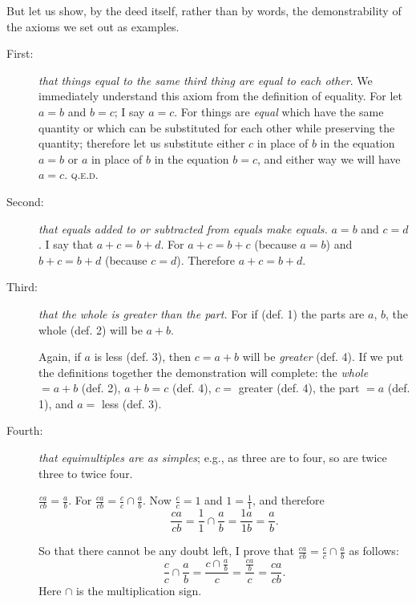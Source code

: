 \documentclass[polutonikogreek,english,twoside,openright]{article}
\begin{document}
But let us show, by the deed itself, rather than by words, the demonstrability
of the axioms we set out as examples.
\begin{description}
\item[First:] {\em that things equal to the same third thing are equal to each
other}.  We immediately understand this axiom from the definition of equality.
For let $a=b$ and $b=c$; I say $a=c$.  For things are {\em equal} which have
the same quantity or which can be substituted for each other while preserving
the quantity; therefore let us substitute either $c$ in place of $b$ in the
equation $a=b$ or $a$ in place of $b$ in the equation $b=c$, and either way we
will have $a=c$.  \textsc{q.e.d.}
\item[Second:] {\em that equals added to or subtracted from equals make
equals.}  $a=b$ and $c=d$. I say that $a+c= b+d$.  For $a+c = b+c$ (because
$a=b$) and $b+c = b+d$ (because $c=d$). Therefore $a+c = b+d$.
\item[Third:] {\em that the whole is greater than the part.}  For if (def. 1)
the parts are $a$, $b$, the whole (def. 2) will be $a+b$.
\begin{center}
\end{center}
Again, if $a$ is less (def. 3), then $c=a+b$ will be {\em greater} (def. 4).
If we put the definitions together the demonstration will complete: the
{\em whole} $= a + b$ (def. 2), $a + b = c$ (def. 4), $c =$ greater (def. 4),
the part $= a$ (def. 1), and $a = $ less (def. 3).

\item[Fourth:] {\em that equimultiples are as simples}; e.g., as three are to
four, so are twice three to twice four.

$\frac{ca}{cb} =\frac{a}{b}$. For $\frac{ca}{cb} = \frac{c}{c} \cap
\frac{a}{b}$.  Now $\frac{c}{c} = 1$ and $1 = \frac{1}{1}$, and therefore
$$\frac{ca}{cb} = \frac{1}{1} \cap \frac{a}{b} = \frac{1a}{1b} =
\frac{a}{b}.$$

So that there cannot be any doubt left, I prove that $\frac{ca}{cb} =
 \frac{c}{c} \cap \frac{a}{b}$ as follows:
$$\frac{c}{c} \cap \frac{a}{b} = \frac{c \cap \frac{a}{b}}{c} =
\frac{\frac{ca}{b}}{c} = \frac{ca}{cb}.$$ Here $\cap$ is the multiplication
sign.


\end{description}
\end{document}
